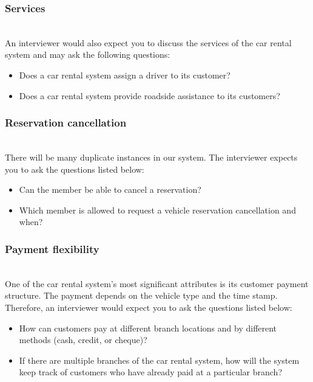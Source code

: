 \subsubsection{Services}\label{vZZ6b0f9U5IzbdlTUJtoz}
\\
An interviewer would also expect you to discuss the services of the car rental system and may ask the following questions:

\begin{itemize}
\item
\protect{}\label{-J3KppTQ8-XFf2UggFFc0}
Does a car rental system assign a driver to its customer?
\item
\protect{}\label{hgusdyRhMxX9OZ52n3M6Y}
Does a car rental system provide roadside assistance to its customers?
\end{itemize}

\subsubsection{Reservation cancellation}\label{An49O3VC7RF8aGSnOL8Zx}
\\
There will be many duplicate instances in our system. The interviewer expects you to ask the questions listed below:

\begin{itemize}
\item
\protect{}\label{6Z7Ecuz40rta-mQIMgC1k}
Can the member be able to cancel a reservation?
\item
\protect{}\label{bG0XQtNrByzNaySsTa887}
Which member is allowed to request a vehicle reservation cancellation and when?
\end{itemize}

\subsubsection{Payment flexibility}\label{SZ6vp8e2JoWoYvOGtiz3-}
\\
One of the car rental system's most significant attributes is its customer payment structure. The payment depends on the vehicle type and the time stamp. Therefore, an interviewer would expect you to ask the questions listed below:

\begin{itemize}
\item
\protect{}\label{6zmiYKcDmeqG1RTk-1gx6}
How can customers pay at different branch locations and by different methods (cash, credit, or cheque)?
\item
\protect{}\label{5aOsIRrjN9gBx70X-VJLo}
If there are multiple branches of the car rental system, how will the system keep track of customers who have already paid at a particular branch?
\end{itemize}

